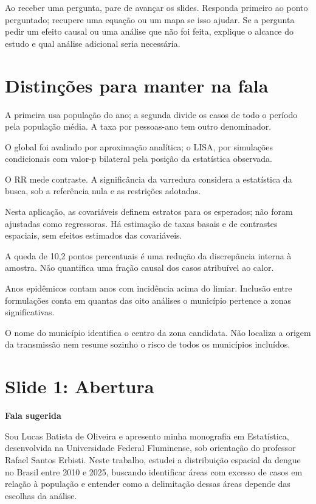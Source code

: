 \documentclass[11pt,a4paper]{article}
\newcommand{\bloco}[1]{\par\Needspace{3\baselineskip}\textbf{#1}\par}
\newcommand{\slide}[2]{\Needspace{12\baselineskip}\section*{Slide #1: #2}\addcontentsline{toc}{section}{Slide #1: #2}}
\begin{document}
Ao receber uma pergunta, pare de avançar os slides. Responda primeiro ao ponto perguntado; recupere uma equação ou um mapa se isso ajudar. Se a pergunta pedir um efeito causal ou uma análise que não foi feita, explique o alcance do estudo e qual análise adicional seria necessária.
\section*{Distinções para manter na fala}
\begin{description}[style=nextline]
\item[Incidência anual e razão acumulada] A primeira usa população do ano; a segunda divide os casos de todo o período pela população média. A taxa por pessoas-ano tem outro denominador.
\item[Moran global e LISA] O global foi avaliado por aproximação analítica; o LISA, por simulações condicionais com valor-p bilateral pela posição da estatística observada.
\item[RR e significância] O RR mede contraste. A significância da varredura considera a estatística da busca, sob a referência nula e as restrições adotadas.
\item[Padronização e regressão] Nesta aplicação, as covariáveis definem estratos para os esperados; não foram ajustadas como regressoras. Há estimação de taxas basais e de contrastes espaciais, sem efeitos estimados das covariáveis.
\item[Calor e redução do WMAPE] A queda de 10,2 pontos percentuais é uma redução da discrepância interna à amostra. Não quantifica uma fração causal dos casos atribuível ao calor.
\item[Duas recorrências] Anos epidêmicos contam anos com incidência acima do limiar. Inclusão entre formulações conta em quantas das oito análises o município pertence a zonas significativas.
\item[Centro da janela] O nome do município identifica o centro da zona candidata. Não localiza a origem da transmissão nem resume sozinho o risco de todos os municípios incluídos.
\end{description}\clearpage
\slide{1}{Abertura}
\bloco{Fala sugerida}
Sou Lucas Batista de Oliveira e apresento minha monografia em Estatística, desenvolvida na Universidade Federal Fluminense, sob orientação do professor Rafael Santos Erbisti. Neste trabalho, estudei a distribuição espacial da dengue no Brasil entre 2010 e 2025, buscando identificar áreas com excesso de casos em relação à população e entender como a delimitação dessas áreas depende das escolhas da análise.
\end{document}
